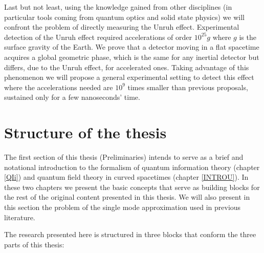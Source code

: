 Last but not least, using the knowledge gained from other disciplines (in particular tools coming from quantum optics and solid state physics) we will confront the problem of directly measuring the Unruh effect. Experimental detection of the Unruh effect  \cite{ChenTaj,Crispino} required accelerations of order $10^{25}g$ where $g$ is the surface gravity of the Earth. We prove that a detector moving in a flat spacetime acquires a global geometric phase, which is the same for any inertial detector but differs, due to the Unruh effect, for accelerated ones. Taking advantage of this phenomenon we will propose a general experimental setting to detect this effect where the accelerations needed are $10^9$ times smaller than previous proposals, sustained only for a few nanoseconds' time.


\section*{Structure of the thesis}
\begin{list}{}{\leftmargin=1em}
 \item The first section of this thesis (Preliminaries) intends to serve as a brief and notational introduction to the formalism of quantum information theory (chapter \ref{QIi}) and quantum field theory in curved spacetimes (chapter \ref{INTROU}). In these two chapters we present the basic concepts that serve as building blocks for the rest of the original content presented in this thesis. We will also present in this section the problem of the single mode approximation used in previous literature.\end{list}
 
\noindent The research presented here is structured in three blocks that conform the three parts of this thesis:


